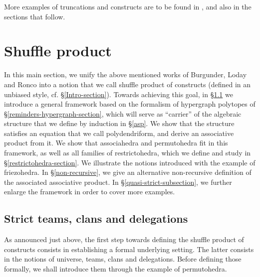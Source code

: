 More examples of truncations and constructs are to be found in \cite{DP,COI}, and also in the sections that follow. 




\section{Shuffle product} \label{strict-teams}

In this main section, we unify the above mentioned works of Burgunder, Loday and Ronco into a notion that we call   shuffle product of constructs (defined in an unbiased style, cf. \S\ref{Intro-section}). Towards achieving this goal, in \S\ref{tcd} we introduce a general  framework based on the formalism of hypergraph polytopes of \S\ref{reminders-hypergraph-section},  which will serve as ``carrier'' of the algebraic structure that we define by induction in \S\ref{asp}. We show that the structure satisfies an equation that we call polydendriform, and derive an associative product from it. We show that associahedra and permutohedra fit in this framework, as well as all families of restrictohedra, which we define and study in \S\ref{restrictohedra-section}. We illustrate the notions introduced with the example of  friezohedra. In \S\ref{non-recursive}, we give an alternative non-recursive definition of the associated associative product. 
 In \S\ref{quasi-strict-subsection}, we further enlarge  the    framework  in order to cover more examples.
 
 \subsection{Strict teams, clans and delegations}\label{tcd} As announced just above, the first step towards defining the shuffle product of constructs  consists in establishing a formal  underlying setting. The latter consists in the notions of universe, teams, clans and delegations. Before defining those formally, we shall introduce them
through the example of permutohedra.

